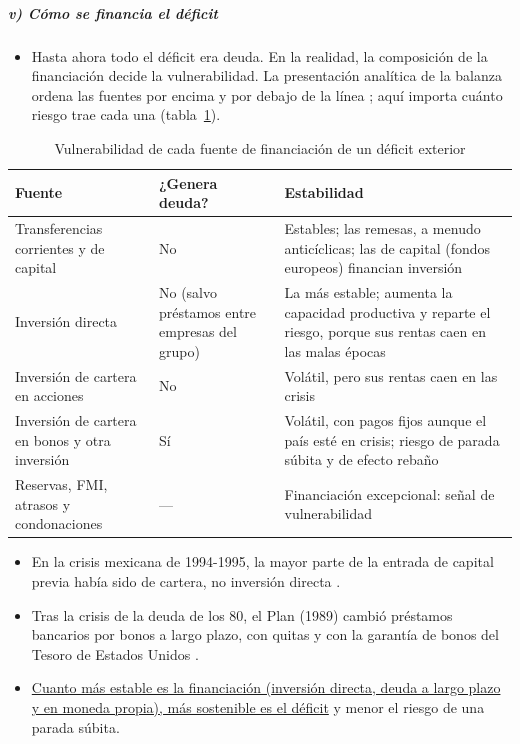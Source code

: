 \documentclass[11pt]{article}
\begin{document}
\subparagraph{v) Cómo se financia el déficit}

\begin{itemize}
\item Hasta ahora todo el déficit era deuda. En la realidad, la composición de la financiación decide la vulnerabilidad. La presentación analítica de la balanza ordena las fuentes por encima y por debajo de la línea ; aquí importa cuánto riesgo trae cada una (tabla~\ref{tab:fuentes-financiacion}).
\end{itemize}

\begin{table}[H]
\centering
\caption{Vulnerabilidad de cada fuente de financiación de un déficit exterior}\label{tab:fuentes-financiacion}
\small
\begin{tabular}{>{\raggedright\arraybackslash}m{3.6cm}>{\raggedright\arraybackslash}m{3.4cm}>{\raggedright\arraybackslash}m{6.6cm}}
\toprule
\rowcolor{tceeazulpalido} Fuente & ¿Genera deuda? & Estabilidad \\
\midrule
Transferencias corrientes y de capital & No & Estables; las remesas, a menudo anticíclicas; las de capital (fondos europeos) financian inversión \\
Inversión directa & No (salvo préstamos entre empresas del grupo) & La más estable; aumenta la capacidad productiva y reparte el riesgo, porque sus rentas caen en las malas épocas \\
Inversión de cartera en acciones & No & Volátil, pero sus rentas caen en las crisis \\
Inversión de cartera en bonos y otra inversión & Sí & Volátil, con pagos fijos aunque el país esté en crisis; riesgo de parada súbita y de efecto rebaño \\
Reservas, FMI, atrasos y condonaciones & — & Financiación excepcional: señal de vulnerabilidad \\
\bottomrule
\end{tabular}
\end{table}

\begin{itemize}
\item En la crisis mexicana de 1994-1995, la mayor parte de la entrada de capital previa había sido de cartera, no inversión directa .
\item Tras la crisis de la deuda de los 80, el Plan  (1989) cambió préstamos bancarios por bonos a largo plazo, con quitas y con la garantía de bonos del Tesoro de Estados Unidos .
\item \uline{Cuanto más estable es la financiación (inversión directa, deuda a largo plazo y en moneda propia), más sostenible es el déficit} y menor el riesgo de una parada súbita.
\end{itemize}
\end{document}
